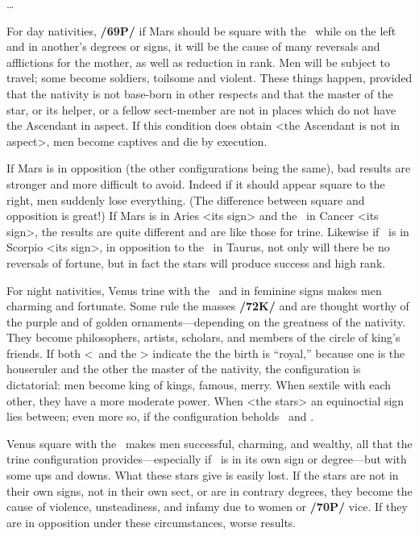 \ldots

For day nativities, \textbf{/69P/} if Mars \marginnote{\Mars \Square \Moon} should be square with the \Moon\, while on the left and in another’s degrees or signs, it will be the cause of many reversals and afflictions for the mother, as well as reduction in rank. Men will be subject to travel; some become soldiers, toilsome and violent. These things happen, provided that the nativity is not base-born in other respects and that the master of the star, or its helper, or a fellow sect-member are not in places which do not have the Ascendant in aspect. If this condition does obtain <the Ascendant is not in aspect>, men become captives and die by execution. 

If Mars is in opposition (the other configurations being the same), bad results are stronger and more difficult to avoid. Indeed if it should appear square to the right, men suddenly lose everything. (The difference between square and opposition is great!) \mndl If Mars is in Aries <its sign> and the \Moon\, in Cancer <its sign>, the results are quite different and are like those for trine. Likewise if \Mars\, is in Scorpio <its sign>, in opposition to the \Moon\, in Taurus, not only will there be no reversals of fortune, but in fact the stars will produce success and high rank.

For night nativities, Venus \marginnote{\Venus \Trine \Moon} trine with the \Moon\, and in feminine signs makes men charming and fortunate. Some rule the masses \textbf{/72K/} and are thought worthy of the purple and of golden ornaments—depending on the greatness of the nativity. They become philosophers, artists, scholars, and members of
the circle of king’s friends. If both <\Venus\, and the \Moon> indicate the the birth is “royal,” because one is
the houseruler and the other the master of the nativity, the configuration is dictatorial: men become king of kings, famous, merry. When sextile with each other, they have a more moderate power. When <the stars> an equinoctial sign lies between; even more so, if the configuration beholds \Pisces\, and \Taurus.

Venus \marginnote{\Venus \Square \Moon} square with the \Moon\, makes men successful, charming, and wealthy, all that the trine configuration provides—especially if \Venus\, is in its own sign or degree—but with some ups and downs. \mndl What these stars give is easily lost. If the stars are not in their own signs, not in their own sect, or are in contrary degrees, they become the cause of violence, unsteadiness, and infamy due to women or \textbf{/70P/} vice.
If they are in opposition under these circumstances, worse results.

